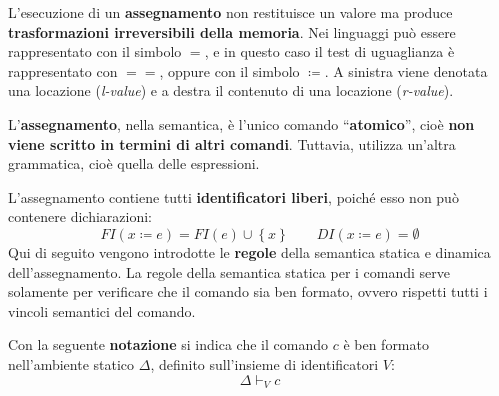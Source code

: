 \documentclass[a4paper]{article}
\newcommand{\dquotes}[1]{``#1''}
\begin{document}
 	L'esecuzione di un \textcolor{Red3}{\textbf{assegnamento}} non restituisce un valore ma produce \textbf{trasformazioni irreversibili della memoria}. Nei linguaggi può essere rappresentato con il simbolo $=$, e in questo caso il test di uguaglianza è rappresentato con $==$, oppure con il simbolo $\coloneq$. A sinistra viene denotata una locazione (\emph{l-value}) e a destra il contenuto di una locazione (\emph{r-value}).\newline
 	
 	\noindent
 	L'\textbf{assegnamento}, nella semantica, è l'unico comando \dquotes{\textbf{atomico}}, cioè \textbf{non viene scritto in termini di altri comandi}. Tuttavia, utilizza un'altra grammatica, cioè quella delle espressioni.\newline
 	
 	\noindent
 	L'assegnamento contiene tutti \textbf{identificatori liberi}, poiché esso non può contenere dichiarazioni:
 	\begin{equation*}
 		FI\left(x \coloneq e\right) = FI\left(e\right) \cup \left\{x\right\} \hspace{2em} DI\left(x \coloneq e\right) = \emptyset
 	\end{equation*}
 	Qui di seguito vengono introdotte le \textcolor{Red3}{\textbf{regole}} della semantica statica e dinamica dell'assegnamento. La regole della semantica statica per i comandi serve solamente per verificare che il comando sia ben formato, ovvero rispetti tutti i vincoli semantici del comando. 
 	
 	Con la seguente \textbf{notazione} si indica che il comando $c$ è ben formato nell'ambiente statico $\Delta$, definito sull'insieme di identificatori $V$:
 	\begin{equation*}
 		\Delta \vdash_{V} c
 	\end{equation*}\newpage
 	
\end{document}
